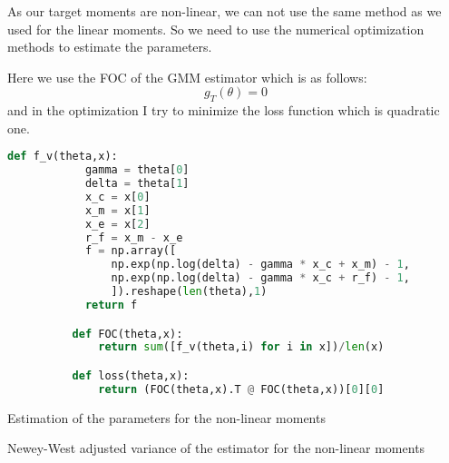 \begin{enumerate}[(a)]
        As our target moments are non-linear, we can not use the same method as we used for the linear moments. So we need to use the numerical optimization methods to estimate the parameters. 

        Here we use the FOC of the GMM estimator which is as follows:
        \begin{equation*}
          g_T(\theta) = 0
        \end{equation*}
        and in the optimization I try to minimize the loss function which is quadratic one.
        \begin{lstlisting}[language=Python, caption= Python code for defining the moments and the loss function for the non-linear moments, label={pcode:1e}, escapechar=|, frame=single, basicstyle=\small, showstringspaces=false, captionpos=b, breaklines=true, showspaces=false, showtabs=false, keywordstyle=\color{blue}, commentstyle=\color{gray}]
          def f_v(theta,x):
            gamma = theta[0]
            delta = theta[1]
            x_c = x[0]
            x_m = x[1]
            x_e = x[2]
            r_f = x_m - x_e
            f = np.array([
                np.exp(np.log(delta) - gamma * x_c + x_m) - 1,
                np.exp(np.log(delta) - gamma * x_c + r_f) - 1,
                ]).reshape(len(theta),1)
            return f

          def FOC(theta,x):
              return sum([f_v(theta,i) for i in x])/len(x)

          def loss(theta,x):
              return (FOC(theta,x).T @ FOC(theta,x))[0][0]
    \end{lstlisting}
    
    \begin{table}[htbp!]
      \centering
      \caption{Estimation of the parameters for the non-linear moments}
      \label{tab:1e}
      
    \end{table}
    \begin{table}[htbp!]
      \centering
      \caption{Newey-West adjusted variance of the estimator for the non-linear moments}
      \label{tab:1e_sd}
      
    \end{table}
\end{enumerate}
